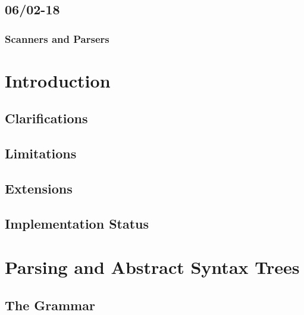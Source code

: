 \documentclass[a4paper,10pt,titlepage]{report}
\begin{document}
\subsection{06/02-18}

\subsubsection{Scanners and Parsers}



























\newpage

\section{Introduction}

\subsection{Clarifications}

\subsection{Limitations}

\subsection{Extensions}

\subsection{Implementation Status}

\section{Parsing and Abstract Syntax Trees}

\subsection{The Grammar}
\end{document}
